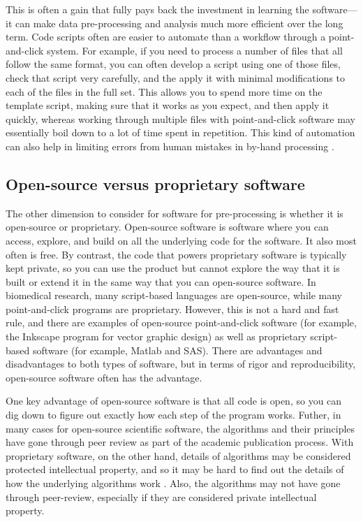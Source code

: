 \documentclass[]{tufte-book}
\begin{document}
This is often a gain that fully pays back the investment in learning the
software---it can make data pre-processing and analysis much more efficient over
the long term. Code scripts often are easier to automate than a workflow through
a point-and-click system. For example, if you need to process a number of files
that all follow the same format, you can often develop a script using one of
those files, check that script very carefully, and the apply it with minimal
modifications to each of the files in the full set. This allows you to spend
more time on the template script, making sure that it works as you expect, and
then apply it quickly, whereas working through multiple files with
point-and-click software may essentially boil down to a lot of time spent in
repetition. This kind of automation can also help in limiting errors from human
mistakes in by-hand processing \citep{gibb2014reproducibility}.

\subsection{Open-source versus proprietary software}\label{open-source-versus-proprietary-software}

The other dimension to consider for software for pre-processing is whether it is
open-source or proprietary. Open-source software is software where you can
access, explore, and build on all the underlying code for the software. It also
most often is free. By contrast, the code that powers proprietary software is
typically kept private, so you can use the product but cannot explore the way
that it is built or extend it in the same way that you can open-source software.
In biomedical research, many script-based languages are open-source, while many
point-and-click programs are proprietary. However, this is not a hard and fast
rule, and there are examples of open-source point-and-click software (for
example, the Inkscape program for vector graphic design) as well as proprietary
script-based software (for example, Matlab and SAS). There are advantages and
disadvantages to both types of software, but in terms of rigor and
reproducibility, open-source software often has the advantage.

One key advantage of open-source software is that all code is open, so you can
dig down to figure out exactly how each step of the program works. Futher, in
many cases for open-source scientific software, the algorithms and their
principles have gone through peer review as part of the academic publication
process. With proprietary software, on the other hand, details of algorithms may
be considered protected intellectual property, and so it may be hard to find out
the details of how the underlying algorithms work \citep{nekrutenko2012next}. Also,
the algorithms may not have gone through peer-review, especially if they are
considered private intellectual property.
\end{document}
